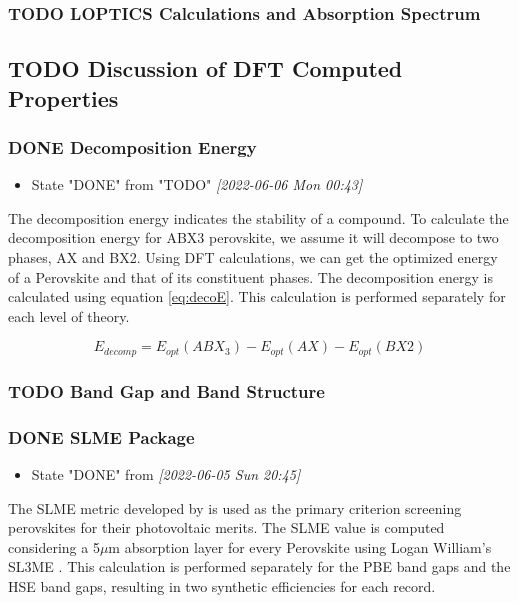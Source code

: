 \documentclass[twoside, twocolumn, 9pt, draft]{article}
\begin{document}
\subsubsection*{{\bfseries\sffamily TODO} LOPTICS Calculations and Absorption Spectrum}
\label{sec:org37b2be3}

\subsection*{{\bfseries\sffamily TODO} Discussion of DFT Computed Properties}
\label{sec:orgfc3d23c}
\subsubsection*{{\bfseries\sffamily DONE} Decomposition Energy}
\label{sec:orgbe45ef7}
\begin{itemize}
\item State "DONE"       from "TODO"       \textit{[2022-06-06 Mon 00:43]}
\end{itemize}
The decomposition energy indicates the stability of a compound. To
calculate the decomposition energy for ABX3 perovskite, we assume it
will decompose to two phases, AX and BX2. Using DFT calculations, we
can get the optimized energy of a Perovskite and that of its
constituent phases. The decomposition energy is calculated using
equation \eqref{eq:decoE}. This calculation is performed separately for
each level of theory.

\begin{equation}\label{eq:decoE}
E_{decomp} = E_{opt}(ABX_3) - E_{opt}(AX) - E_{opt}(BX2)
\end{equation}

\subsubsection*{{\bfseries\sffamily TODO} Band Gap and Band Structure}
\label{sec:org4b00cad}

\subsubsection*{{\bfseries\sffamily DONE} SLME Package}
\label{sec:org08a7947}
\begin{itemize}
\item State "DONE"       from              \textit{[2022-06-05 Sun 20:45]}
\end{itemize}
The SLME metric developed by \citet{yu-2012-ident-poten} is used as the
primary criterion screening perovskites for their photovoltaic
merits. The SLME value is computed considering a 5\(\mu\)m absorption layer
for every Perovskite using Logan William's SL3ME
\cite{williams-2022-sl3me}. This calculation is performed separately
for the PBE band gaps and the HSE band gaps, resulting in two
synthetic efficiencies for each record.
\end{document}
